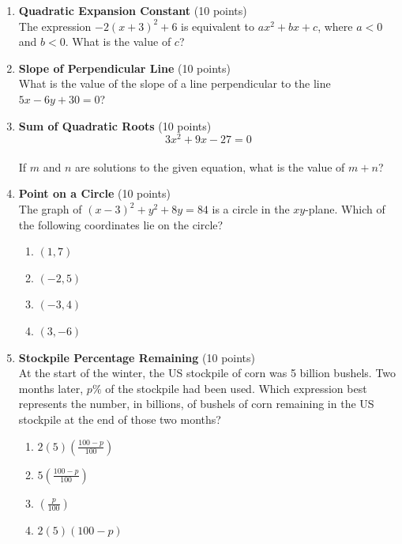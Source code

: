 \begin{enumerate}
  \item \textbf{Quadratic Expansion Constant} (10 points)\\
  The expression $-2(x+3)^2+6$ is equivalent to $a x^2+b x+c$, where $a<0$ and $b<0$. What is the value of $c$?
  \begin{subanswer}
  \end{subanswer}

  \item \textbf{Slope of Perpendicular Line} (10 points)\\
  What is the value of the slope of a line perpendicular to the line $5x-6y+30=0$?
  \begin{subanswer}
  \end{subanswer}

  \newpage

  \item \textbf{Sum of Quadratic Roots} (10 points)\\
  $$3x^2+9x-27=0$$\\
  If $m$ and $n$ are solutions to the given equation, what is the value of $m+n$?
  \begin{subanswer}
  \end{subanswer}

  \item \textbf{Point on a Circle} (10 points)\\
  The graph of $(x-3)^2+y^2+8y=84$ is a circle in the $xy$-plane. Which of the following coordinates lie on the circle?
  \begin{enumerate}[label=\Alph*.]
    \item $(1,7)$
    \item $(-2,5)$
    \item $(-3,4)$
    \item $(3,-6)$
  \end{enumerate}
  \begin{subanswer}
  \end{subanswer}

  \item \textbf{Stockpile Percentage Remaining} (10 points)\\
  At the start of the winter, the US stockpile of corn was 5 billion bushels. Two months later, $p\%$ of the stockpile had been used. Which expression best represents the number, in billions, of bushels of corn remaining in the US stockpile at the end of those two months?
  \begin{enumerate}[label=\Alph*.]
    \item $2(5)\left(\frac{100-p}{100}\right)$
    \item $5\left(\frac{100-p}{100}\right)$
    \item $\left(\frac{p}{100}\right)$
    \item $2(5)(100-p)$
  \end{enumerate}
  \begin{subanswer}
  \end{subanswer}


\end{enumerate}
